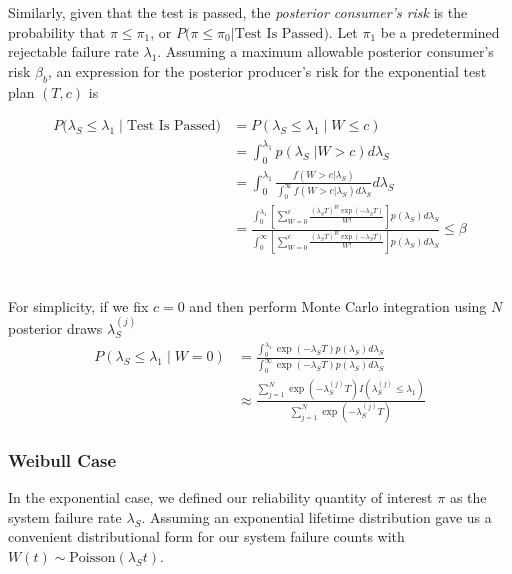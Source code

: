 \documentclass[12pt]{article}
\begin{document}
Similarly, given that the test is passed, the \emph{posterior consumer's risk}
is the probability that $\pi \leq \pi_1$, or $P \text{(}\pi \leq \pi_0 \vert
\text{Test Is Passed)}$.  Let $\pi_1$ be a predetermined rejectable
failure rate $\lambda_1$. Assuming a maximum allowable posterior consumer's
risk $\beta_b$, an expression for the posterior producer's risk for the
exponential test plan $(T,c)$ is

$$
\begin{aligned}
    P(\lambda_S \leq \lambda_1 \; \vert \; \text{Test Is Passed)} &= P(\lambda_S
    \leq \lambda_1 \; \vert \; W \leq c) \\ &= \int_{0}^{\lambda_1} p(\lambda_S \;
    \vert W > c) d\lambda_S \\ &= \int_{0}^{\lambda_1} \frac{f(W > c \vert
    \lambda_S)}{\int_{0}^{\infty} f(W > c \vert \lambda_S) d\lambda_S} d\lambda_S \\ &=
    \frac{\int_{0}^{\lambda_1} [ \sum_{W=0}^c \frac{(\lambda_S T)^W
    \exp(-\lambda_S T)}{W!}]p(\lambda_S)d\lambda_S} {\int_{0}^{\infty} [
    \sum_{W=0}^c \frac{(\lambda_S T)^W \exp(-\lambda_S
    T)}{W!}]p(\lambda_S)d\lambda_S} \leq \beta
\end{aligned}
$$
\\
\\
For simplicity, if we fix $c = 0$ and then perform Monte Carlo integration
using $N$ posterior draws $ \lambda_S^{(j)} $ $$
\begin{aligned}
	 P(\lambda_S \leq \lambda_1 \; \vert \; W = 0) &= \frac{\int_{0}^{\lambda_1}
	 \exp(-\lambda_S T)p(\lambda_S)d\lambda_S} {\int_{0}^{\infty} \exp(-\lambda_S
	 T)p(\lambda_S)d\lambda_S} \\ &\approx \frac{\sum_{j = 1}^{N}
	 \exp(-\lambda_S^{(j)} T)I(\lambda_S^{(j)} \leq \lambda_1)} {\sum_{j = 1}^{N}
	 \exp(-\lambda_S^{(j)} T)}
\end{aligned}
$$

\subsubsection{Weibull Case}
In the exponential case, we defined our reliability quantity of interest $\pi$ as the system failure rate
$\lambda_S$.  Assuming an exponential lifetime distribution gave us a convenient distributional
form for our system failure counts with $W(t) \sim \text{Poisson}(\lambda_S t)$.
\end{document}
